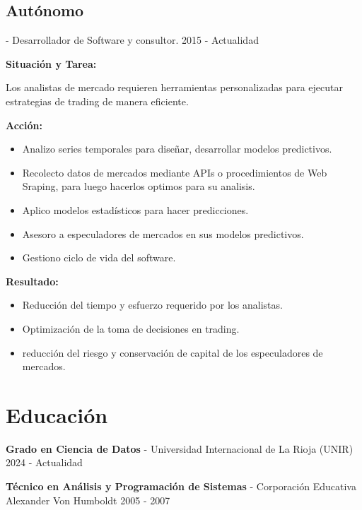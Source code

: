 \documentclass[letterpaper,12pt]{article}
\begin{document}
\subsection*{Autónomo} - Desarrollador de Software y consultor. \hfill 2015 - Actualidad

\textbf{Situación y Tarea:}

Los analistas de mercado requieren herramientas personalizadas para ejecutar estrategias de trading de manera eficiente.

\textbf{Acción:}

\begin{itemize}
    \item Analizo series temporales para diseñar, desarrollar modelos predictivos.
    \item Recolecto datos de mercados mediante APIs o procedimientos de Web Sraping, para luego hacerlos optimos para su analisis.
    \item Aplico modelos estadísticos para hacer predicciones.
    \item Asesoro a especuladores de mercados en sus modelos predictivos.
    \item Gestiono ciclo de vida del software.
\end{itemize}

\textbf{Resultado:}

\begin{itemize}
    \item Reducción del tiempo y esfuerzo requerido por los analistas.
    \item Optimización de la toma de decisiones en trading.
    \item reducción del riesgo y conservación de capital de los especuladores de mercados.
\end{itemize}

\section*{Educación}

\textbf{Grado en Ciencia de Datos} - Universidad Internacional de La Rioja (UNIR) \hfill 2024 - Actualidad

\textbf{Técnico en Análisis y Programación de Sistemas} - Corporación Educativa Alexander Von Humboldt \hfill 2005 - 2007
\end{document}
